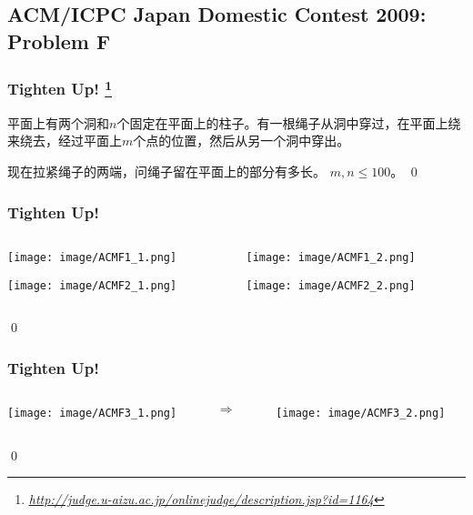 \documentclass[9pt,dvipsnames,table]{beamer}
\newcommand{\hlink}[1]{
	\footnote{\fontsize{6pt}{\baselineskip}\href{#1}{\textsl{\underline{\url{#1}}}}}
}
\newenvironment{qedframe}{%
	\begin{frame}[environment=qedqedframe]%
	}{%
	\qed
	\end{frame}%
}
\begin{document}
\subsection{ACM/ICPC Japan Domestic Contest 2009: Problem F}
\begin{qedframe}
	\frametitle{Tighten Up!\hlink{http://judge.u-aizu.ac.jp/onlinejudge/description.jsp?id=1164}}
	平面上有两个洞和$n$个固定在平面上的柱子。有一根绳子从洞中穿过，在平面上绕来绕去，经过平面上$m$个点的位置，然后从另一个洞中穿出。
	
	现在拉紧绳子的两端，问绳子留在平面上的部分有多长。 $m,n\leq 100$。
\end{qedframe}
\begin{qedframe}
	\frametitle{Tighten Up!}
	\begin{columns}
		\begin{column}{0.475\textwidth}
			\begin{center}
				\texttt{[image: image/ACMF1\_1.png]}
				
				\texttt{[image: image/ACMF2\_1.png]}
			\end{center}
		\end{column}
		\begin{column}{0.05\textwidth}
			\begin{center}
				$\Longrightarrow$
				\vskip 6em
				$\Longrightarrow$
			\end{center}
		\end{column}
		\begin{column}{0.475\textwidth}
			\begin{center}
				\texttt{[image: image/ACMF1\_2.png]}
				
				\texttt{[image: image/ACMF2\_2.png]}
			\end{center}
		\end{column}
	\end{columns}
\end{qedframe}
\begin{qedframe}
	\frametitle{Tighten Up!}
	\begin{columns}
		\begin{column}{0.475\textwidth}
			\begin{center}
				\texttt{[image: image/ACMF3\_1.png]}
			\end{center}
		\end{column}
		\begin{column}{0.05\textwidth}
			\begin{center}
				$\Longrightarrow$
			\end{center}
		\end{column}
		\begin{column}{0.475\textwidth}
			\begin{center}
				\texttt{[image: image/ACMF3\_2.png]}
			\end{center}
		\end{column}
	\end{columns}
\end{qedframe}
\end{document}
